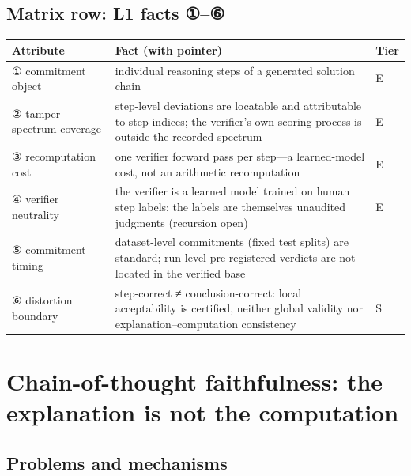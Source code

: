 \documentclass[11pt,a4paper]{article}
\begin{document}
\subsection{Matrix row: L1 facts ①–⑥}

\begin{table}[htbp]
\centering
\footnotesize
\setlength{\tabcolsep}{3.5pt}
\renewcommand{\arraystretch}{1.18}
\begin{tabularx}{0.985\textwidth}{>{\raggedright\arraybackslash}p{} >{\raggedright\arraybackslash}X >{\raggedright\arraybackslash}p{}}
\toprule
\textbf{Attribute} & \textbf{Fact (with pointer)} & \textbf{Tier} \\
\midrule
① commitment object & individual reasoning steps of a generated solution chain \cite{key05,key06} & E \\
② tamper-spectrum coverage & step-level deviations are locatable and attributable to step indices; the verifier's own scoring process is outside the recorded spectrum \cite{key05,key06} & E \\
③ recomputation cost & one verifier forward pass per step—a learned-model cost, not an arithmetic recomputation \cite{key06} & E \\
④ verifier neutrality & the verifier is a learned model trained on human step labels; the labels are themselves unaudited judgments (recursion open) \cite{key06} & E \\
⑤ commitment timing & dataset-level commitments (fixed test splits) are standard; run-level pre-registered verdicts are not located in the verified base & — \\
⑥ distortion boundary & step-correct ≠ conclusion-correct: local acceptability is certified, neither global validity nor explanation–computation consistency & S \\
\bottomrule
\end{tabularx}
\end{table}

\section{Chain-of-thought faithfulness: the explanation is not the computation}

\subsection{Problems and mechanisms}
\end{document}
